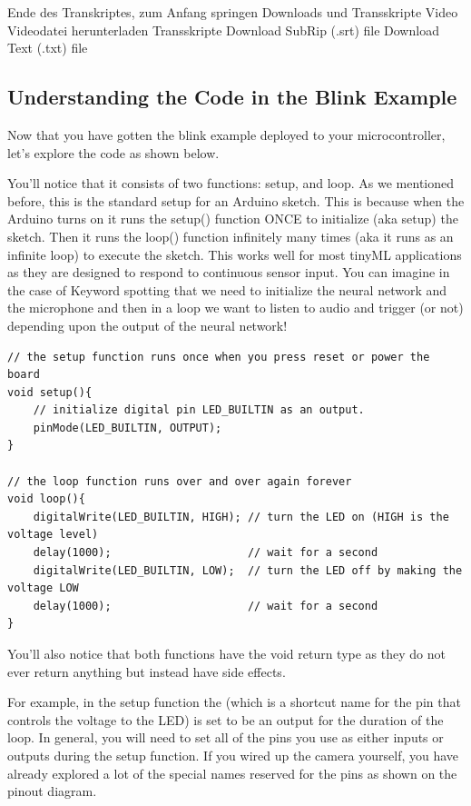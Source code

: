 Ende des Transkriptes, zum Anfang springen
Downloads und Transskripte
Video
Videodatei herunterladen
Transskripte
Download SubRip (.srt) file
Download Text (.txt) file

\subsection{Understanding the Code in the Blink Example}

Now that you have gotten the blink example deployed to your microcontroller, let's explore the code as shown below.

You’ll notice that it consists of two functions: setup, and loop. As we mentioned before, this is the standard setup for an Arduino sketch. This is because when the Arduino turns on it runs the setup() function ONCE to initialize (aka setup) the sketch. Then it runs the loop() function infinitely many times (aka it runs as an infinite loop) to execute the sketch. This works well for most tinyML applications as they are designed to respond to continuous sensor input. You can imagine in the case of Keyword spotting that we need to initialize the neural network and the microphone and then in a loop we want to listen to audio and trigger (or not) depending upon the output of the neural network!


\begin{lstlisting}
// the setup function runs once when you press reset or power the board
void setup(){
    // initialize digital pin LED_BUILTIN as an output.
    pinMode(LED_BUILTIN, OUTPUT);
}

// the loop function runs over and over again forever
void loop(){
    digitalWrite(LED_BUILTIN, HIGH); // turn the LED on (HIGH is the voltage level)
    delay(1000);                     // wait for a second
    digitalWrite(LED_BUILTIN, LOW);  // turn the LED off by making the voltage LOW
    delay(1000);                     // wait for a second
}
\end{lstlisting}

You’ll also notice that both functions have the void return type as they do not ever return anything but instead have side effects.

For example, in the setup function the  (which is a shortcut name for the pin that controls the voltage to the LED) is set to be an output for the duration of the loop. In general, you will need to set all of the pins you use as either inputs or outputs during the setup function. If you wired up the camera yourself, you have already explored a lot of the special names reserved for the pins as shown on the pinout diagram.

